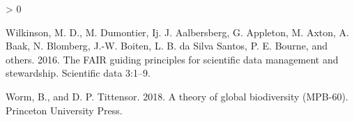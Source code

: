 \documentclass[
  12pt,
]{article}
\newlength{\cslhangindent}
\newenvironment{CSLReferences}[2] %
 {%
  \setlength{\parindent}{0pt}
  \ifodd #1 \everypar{\setlength{\hangindent}{\cslhangindent}}\ignorespaces\fi
  \ifnum #2 > 0
  \setlength{\parskip}{#2\baselineskip}
  \fi
 }%
 {}
\begin{document}
\begin{CSLReferences}{1}{0}
\leavevmode\hypertarget{ref-wilkinson2016fair}{}%
Wilkinson, M. D., M. Dumontier, Ij. J. Aalbersberg, G. Appleton, M. Axton, A. Baak, N. Blomberg, J.-W. Boiten, L. B. da Silva Santos, P. E. Bourne, and others. 2016. The FAIR guiding principles for scientific data management and stewardship. Scientific data 3:1--9.

\leavevmode\hypertarget{ref-worm2018theory}{}%
Worm, B., and D. P. Tittensor. 2018. A theory of global biodiversity (MPB-60). Princeton University Press.

\end{CSLReferences}
\end{document}
